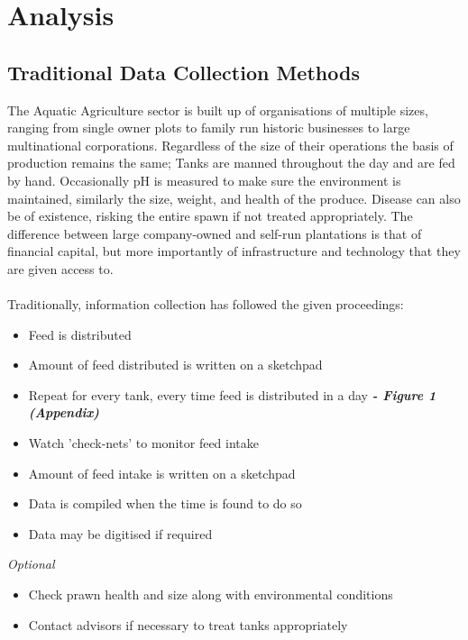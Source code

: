 \documentclass[a4paper,11pt]{proc}
\begin{document}
\section{Analysis}
\subsection{Traditional Data Collection Methods}

The Aquatic Agriculture sector is built up of organisations of multiple sizes, ranging from single owner plots to family run historic businesses to large multinational corporations. Regardless of the size of their operations the basis of production remains the same; Tanks are manned throughout the day and are fed by hand. Occasionally pH is measured to make sure the environment is maintained, similarly the size, weight, and health of the produce. Disease can also be of existence, risking the entire spawn if not treated appropriately. The difference between large company-owned and self-run plantations is that of financial capital, but more importantly of infrastructure and technology that they are given access to.\\
\\Traditionally, information collection has followed the given proceedings:

\begin{itemize}
      \item Feed is distributed
      \item Amount of feed distributed is written on a sketchpad
      \item Repeat for every tank, every time feed is distributed in a day\textbf{\textit{ - Figure 1 (Appendix)}}
      \item Watch 'check-nets' to monitor feed intake
      \item Amount of feed intake is written on a sketchpad
      \item Data is compiled when the time is found to do so
      \item Data may be digitised if required
\end{itemize}
      \textit{Optional}
\begin{itemize}
      \item Check prawn health and size along with environmental conditions
      \item Contact advisors if necessary to treat tanks appropriately
\end{itemize}
\end{document}
